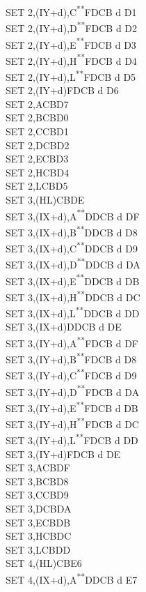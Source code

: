 \documentclass[twoside,openright,a4paper]{book}
\newcommand{\UNDOC}{\textnormal{\textsuperscript{**}}}
\begin{document}
\begin{multicols}{3}
{\begin{tabbing}
	SET 2,(IY+d),C\UNDOC\>FDCB d D1\\
	SET 2,(IY+d),D\UNDOC\>FDCB d D2\\
	SET 2,(IY+d),E\UNDOC\>FDCB d D3\\
	SET 2,(IY+d),H\UNDOC\>FDCB d D4\\
	SET 2,(IY+d),L\UNDOC\>FDCB d D5\\
	SET 2,(IY+d)\>FDCB d D6\\
	SET 2,A\>CBD7\\
	SET 2,B\>CBD0\\
	SET 2,C\>CBD1\\
	SET 2,D\>CBD2\\
	SET 2,E\>CBD3\\
	SET 2,H\>CBD4\\
	SET 2,L\>CBD5\\
	SET 3,(HL)\>CBDE\\
	SET 3,(IX+d),A\UNDOC\>DDCB d DF\\
	SET 3,(IX+d),B\UNDOC\>DDCB d D8\\
	SET 3,(IX+d),C\UNDOC\>DDCB d D9\\
	SET 3,(IX+d),D\UNDOC\>DDCB d DA\\
	SET 3,(IX+d),E\UNDOC\>DDCB d DB\\
	SET 3,(IX+d),H\UNDOC\>DDCB d DC\\
	SET 3,(IX+d),L\UNDOC\>DDCB d DD\\
	SET 3,(IX+d)\>DDCB d DE\\
	SET 3,(IY+d),A\UNDOC\>FDCB d DF\\
	SET 3,(IY+d),B\UNDOC\>FDCB d D8\\
	SET 3,(IY+d),C\UNDOC\>FDCB d D9\\
	SET 3,(IY+d),D\UNDOC\>FDCB d DA\\
	SET 3,(IY+d),E\UNDOC\>FDCB d DB\\
	SET 3,(IY+d),H\UNDOC\>FDCB d DC\\
	SET 3,(IY+d),L\UNDOC\>FDCB d DD\\
	SET 3,(IY+d)\>FDCB d DE\\
	SET 3,A\>CBDF\\
	SET 3,B\>CBD8\\
	SET 3,C\>CBD9\\
	SET 3,D\>CBDA\\
	SET 3,E\>CBDB\\
	SET 3,H\>CBDC\\
	SET 3,L\>CBDD\\
	SET 4,(HL)\>CBE6\\
	SET 4,(IX+d),A\UNDOC\>DDCB d E7\\

\end{tabbing}}
\end{multicols}
\end{document}
